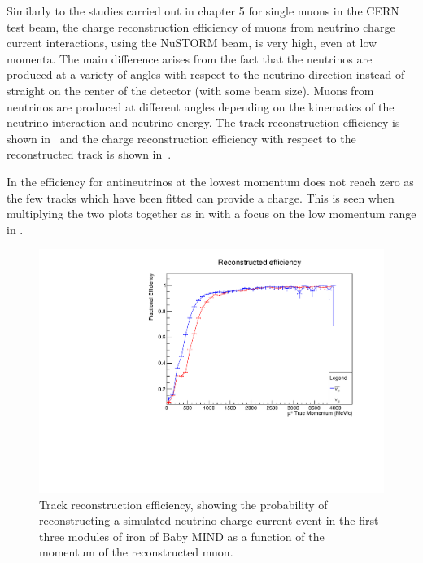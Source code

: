 Similarly to the studies carried out in chapter 5 for single muons in the CERN test beam, the charge reconstruction efficiency of muons from neutrino charge current interactions, using the NuSTORM beam, is very high, even at low momenta. The main difference arises from the fact that the neutrinos are produced at a variety of angles with respect to the neutrino direction instead of straight on the center of the detector (with some beam size). Muons from neutrinos are produced at different angles depending on the kinematics of the neutrino interaction and neutrino energy. The track reconstruction efficiency is shown in~ and the charge reconstruction efficiency with respect to the reconstructed track is shown in~.

In  the efficiency for antineutrinos at the lowest momentum does not reach zero as the few tracks which have been fitted can provide a charge. This is seen when multiplying the two plots together as in  with a focus on the low momentum range in .




\begin{figure}[h!]
\centering
\includegraphics[width=.9\textwidth]{figures/NeutrinoChap/Neutrino/T2KIronRecEff.pdf}
\caption{Track reconstruction efficiency, showing the probability of reconstructing a simulated neutrino charge current event in the first three modules of iron of Baby MIND as a function of the momentum of the reconstructed muon.}
\label{fig:IronMINDfitted}
\end{figure}

